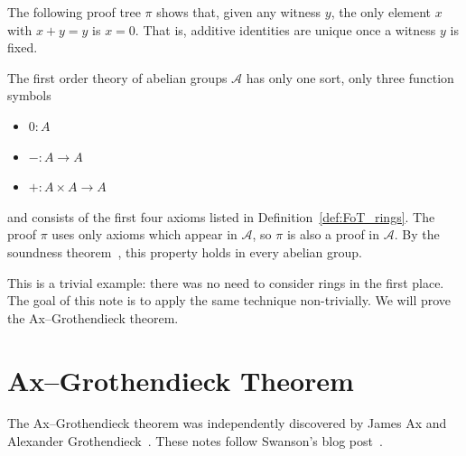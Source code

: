 \documentclass[12pt]{article}
\theoremstyle{plain}
\theoremstyle{definition}
\newcommand{\call}[1]{\mathcal{#1}}
\newcommand{\lto}{\longrightarrow}
\begin{document}
The following proof tree $\pi$ shows that, given any witness $y$, the only element $x$ with $x+y=y$ is $x=0$. That is, additive identities are unique once a witness $y$ is fixed.

\begin{center}
\end{center}

The first order theory of abelian groups $\call{A}$ has only one sort, only three function symbols
\begin{itemize}
\item $0: A$
\item $-: A \lto A$
\item $+: A \times A \lto A$
\end{itemize}
and consists of the first four axioms listed in Definition~\ref{def:FoT_rings}. The proof $\pi$ uses only axioms which appear in $\call{A}$, so $\pi$ is also a proof in $\call{A}$. By the soundness theorem~\cite{Troiani}, this property holds in every abelian group.

This is a trivial example: there was no need to consider rings in the first place. The goal of this note is to apply the same technique non-trivially. We will prove the Ax--Grothendieck theorem.

\section{Ax--Grothendieck Theorem}

The Ax--Grothendieck theorem was independently discovered by James Ax and Alexander Grothendieck~\cite{Ax,Grothendieck}. These notes follow Swanson's blog post~\cite{Swanson}.
\end{document}
